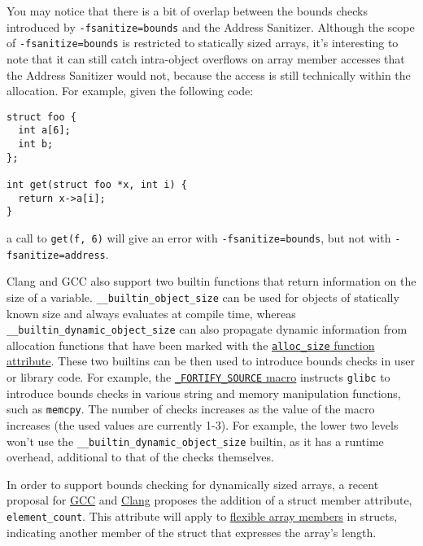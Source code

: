 \documentclass[
  a4paper,
]{report}
\begin{document}
You may notice that there is a bit of overlap between the bounds checks
introduced by \texttt{-fsanitize=bounds} and the Address Sanitizer.
Although the scope of \texttt{-fsanitize=bounds} is restricted to
statically sized arrays, it's interesting to note that it can still
catch intra-object overflows on array
member accesses that the Address Sanitizer would not, because the access
is still technically within the allocation. For example, given the
following code:

\begin{verbatim}
struct foo {
  int a[6];
  int b;
};

int get(struct foo *x, int i) {
  return x->a[i];
}
\end{verbatim}

a call to \texttt{get(f,\ 6)} will give an error with
\texttt{-fsanitize=bounds}, but not with \texttt{-fsanitize=address}.

Clang and GCC also support two builtin functions that return information
on the size of a variable. \texttt{\_\_builtin\_object\_size} can be
used for objects of statically known size and always evaluates at
compile time, whereas \texttt{\_\_builtin\_dynamic\_object\_size} can
also propagate dynamic information from allocation functions that have
been marked with the
\href{https://gcc.gnu.org/onlinedocs/gcc-4.7.2/gcc/Function-Attributes.html}{\texttt{alloc\_size}
function attribute}. These two builtins can be then used to introduce
bounds checks in user or library code. For example, the
\href{https://man7.org/linux/man-pages/man7/feature_test_macros.7.html}{\texttt{\_FORTIFY\_SOURCE}
macro} instructs \texttt{glibc} to introduce bounds checks in various
string and memory manipulation functions, such as \texttt{memcpy}. The
number of checks increases as the value of the macro increases (the used
values are currently 1-3). For example, the lower two levels won't use
the \texttt{\_\_builtin\_dynamic\_object\_size} builtin, as it has a
runtime overhead, additional to that of the checks themselves.

In order to support bounds checking for dynamically sized arrays, a
recent proposal for
\href{https://gcc.gnu.org/bugzilla/show_bug.cgi?id=108896}{GCC} and
\href{https://reviews.llvm.org/D148381}{Clang} proposes the addition of
a struct member attribute, \texttt{element\_count}. This attribute will
apply to
\href{https://en.wikipedia.org/wiki/Flexible_array_member}{flexible
array members} in structs, indicating another member of the struct that
expresses the array's length.
\end{document}

